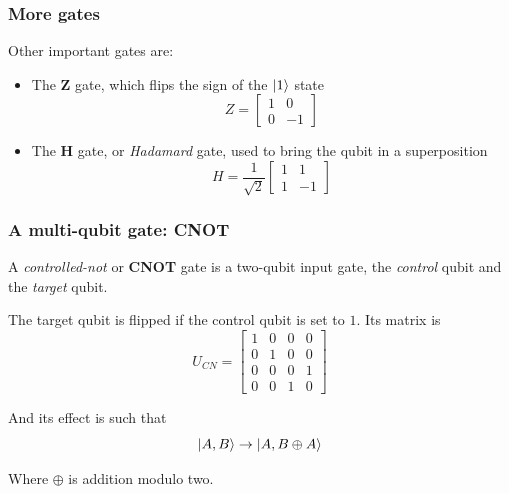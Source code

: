 \documentclass{beamer}
\begin{document}
  \begin{frame}
    \frametitle{More gates}
    Other important gates are:
    \begin{itemize}
      \item The \textbf{Z} gate, which flips the sign of the $\ket{1}$ state
      \begin{equation*}
        Z = \begin{bmatrix}
          1 & 0 \\ 0 & -1
        \end{bmatrix}
      \end{equation*}
      \item The \textbf{H} gate, or \textit{Hadamard} gate, used to bring the qubit in a superposition
      \begin{equation*}
        H = \frac1{\sqrt 2}\begin{bmatrix}
          1 & 1 \\ 1 & -1
        \end{bmatrix}
      \end{equation*}
    \end{itemize}  
  \end{frame}
  \begin{frame}
    \frametitle{A multi-qubit gate: CNOT}
    A \textit{controlled-not} or \textbf{CNOT} gate is a two-qubit input gate, the \textit{control} qubit
    and the \textit{target} qubit.

    The target qubit is flipped if the control qubit is set to $1$. Its matrix is
    \begin{equation*}
      U_{CN} = \begin{bmatrix}
        1 & 0 & 0 & 0 \\
        0 & 1 & 0 & 0 \\
        0 & 0 & 0 & 1 \\
        0 & 0 & 1 & 0
      \end{bmatrix}
    \end{equation*}

    And its effect is such that
    \begin{equation*}
      \ket{A,B} \to \ket{A,B\oplus A}
    \end{equation*}

    Where $\oplus$ is addition modulo two.
  \end{frame}
\end{document}
